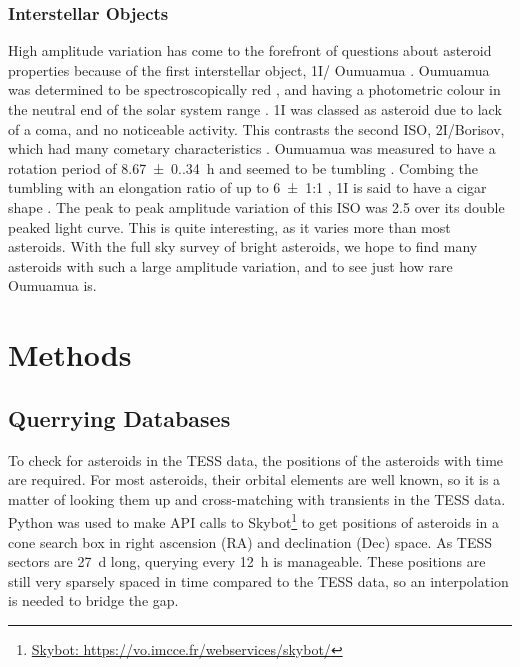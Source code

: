 \documentclass[12pt]{article}
\DeclareRobustCommand{\okina}{%
  \raisebox{\dimexpr\fontcharht\font`A-\height}{%
    \scalebox{0.8}{`}%
  }%
}
\newcommand{\omuamua}{\okina Oumuamua }
\begin{document}
\subsubsection*{Interstellar Objects}
High amplitude variation has come to the forefront of questions about asteroid properties because of the first interstellar object, 1I/\omuamua \citep[see][for a review]{Bannister2019}.
\omuamua was determined to be spectroscopically red \citep{Fitzsimmons2017, Meech2017}, and having a photometric colour in the neutral end of the solar system range \citep{Bannister2017}.
1I was classed as asteroid due to lack of a coma, and no noticeable activity. 
This contrasts the second ISO, 2I/Borisov, which had many cometary characteristics \citep[see ][for a review]{Dorofeeva2023}. %
\omuamua was measured to have a rotation period of \qty{8.67(0.34)}{\hour} \citep{Belton2018} and seemed to be tumbling \citep[e.g.][]{Drahus2018,Fraser2018}.
Combing the tumbling with an elongation ratio of up to \qty{6(1)}{}:1 \citep{McNeill2018}, 1I is said to have a cigar shape \citep{Belton2018}.
The peak to peak amplitude variation of this ISO was \qty{2.5}{\mag} \citep{Meech2017} over its double peaked light curve.
This is quite interesting, as it varies more than most asteroids.
With the full sky survey of bright asteroids, we hope to find many asteroids with such a large amplitude variation, and to see just how rare \omuamua is.


\section{Methods}\label{Sec:Meth}

\subsection{Querrying Databases}\label{SubSec:Querry}

To check for asteroids in the TESS data, the positions of the asteroids with time are required.
For most asteroids, their orbital elements are well known, so it is a matter of looking them up and cross-matching with transients in the TESS data.
Python was used to make API calls to {Skybot}\footnote{\href{https://vo.imcce.fr/webservices/skybot/}{Skybot: https://vo.imcce.fr/webservices/skybot/}} to get positions of asteroids in a cone search box in right ascension (RA) and  declination (Dec) space.
As TESS sectors are \qty{27}{\day} long, querying every \qty{12}{\hour} is manageable.
These positions are still very sparsely spaced in time compared to the TESS data, so an interpolation is needed to bridge the gap.
\end{document}
